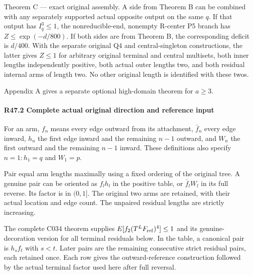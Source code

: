Theorem C — exact original assembly. A side from Theorem B can be
combined with any separately supported actual opposite output on the
same \(q\). If that output has \(I_q^3\le1\), the nonreducible-end, nonempty
R-center P5 branch has \(Z\le \exp(-d/800).\) If both sides are from Theorem B,
the corresponding deficit is \(d/400\). With the separate original Q4 and
central-singleton constructions, the latter gives \(Z\le 1\) for arbitrary
original terminal and central multisets, both inner lengths independently
positive, both actual outer lengths two, and both residual internal arms
of length two. No other original length is identified with these twos.

Appendix A gives a separate optional high-domain theorem for \(a\ge 3.\)


\paragraph{R47.2 Complete actual original direction and reference input}\label{part:R47.2}

For an arm, \(f_n\) means every edge outward from its attachment, \(\bar f_n\) every
edge inward, \(h_n\) the first edge inward and the remaining \(n-1\) outward,
and \(W_n\) the first outward and the remaining \(n-1\) inward. These definitions
also specify \(n=1: h_{1}=q\) and \(W_{1}=p.\)

Pair equal arm lengths maximally using a fixed ordering of the original
tree. A genuine pair can be oriented as \(f_l h_l\) in the positive table,
or \(\bar f_l W_l\) in its full reverse. Its factor is in \((0,1]\). The original
two arms are retained, with their actual location and edge count.
The unpaired residual lengths are strictly increasing. 

The complete C034 theorem supplies \(E[f_2(T^L F_{\rm ref})^4]\le1\)
and its genuine-decoration version for all terminal residuals below.
In the table, a canonical pair is \(h_s f_t\) with \(s<t.\) Later pairs are the
remaining consecutive strict residual pairs, each retained once.
Each row gives the outward-reference construction followed by
the actual terminal factor used here after full reversal.

